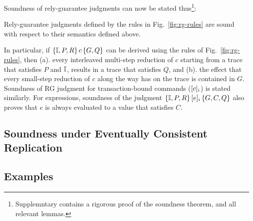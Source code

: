 Soundness of rely-guarantee judgments can now be stated
thus\footnote{Supplemntary contains a rigorous proof of the soundness
theorem, and all relevant lemmas.}:
\begin{theorem}[Soundness] 
Rely-guarantee judgments defined by the rules in
Fig.~\ref{fig:rg-rules} are sound with respect to their semantics
defined above. 
\end{theorem}
\noindent In particular, if $\{\mathbb{I},P,R\}\,c\,\{G,Q\}$ can be derived using
the rules of Fig.~\ref{fig:rg-rules}, then (a). every interleaved
multi-step reduction of $c$ starting from a trace that satisfies $P$
and $\mathbb{I}$, results in a trace that satisfies $Q$, and (b). the effect
that every small-step reduction of $c$ along the way has on the trace
is contained in $G$. Soundness of RG judgment for transaction-bound
commands ($\lbrack c \rbrack_i$) is stated similarly.  For expressions,
soundness of the judgment $\{\mathbb{I},P,R\}\,\lbrack e \rbrack_i\,\{G,C,Q\}$ also
proves that $e$ is always evaluated to a value that satisfies $C$.

\subsection{Soundness under Eventually Consistent Replication}


\subsection{Examples}

